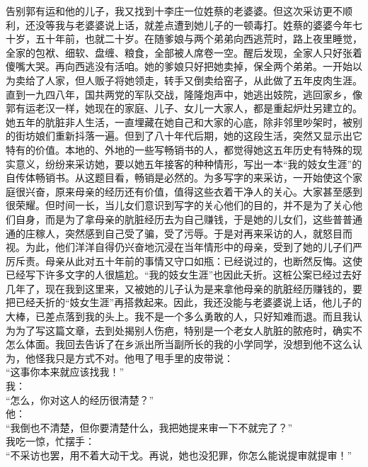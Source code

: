 告别郭有运和他的儿子，我又找到十李庄一位姓蔡的老婆婆。但这次采访更不顺利，还没等我与老婆婆说上话，就差点遭到她儿子的一顿毒打。姓蔡的婆婆今年七十岁，五十年前，也就二十岁。在随爹娘与两个弟弟向西逃荒时，路上夜里睡觉，全家的包袱、细软、盘缠、粮食，全部被人席卷一空。醒后发现，全家人只好张着傻嘴大哭。再向西逃没有活咱。她的爹娘只好把她卖掉，保全两个弟弟。一开始以为卖给了人家，但人贩子将她领走，转手又倒卖给窑子，从此做了五年皮肉生涯。直到一九四八年，国共两党的军队交战，隆隆炮声中，她逃出妓院，逃回家乡，像郭有运老汉一样，她现在的家庭、儿子、女儿一大家人，都是重起炉灶另建立的。她五年的肮脏非人生活，一直埋藏在她自己和大家的心底，除非邻里吵架时，被别的街坊娘们重新抖落一遍。但到了八十年代后期，她的这段生活，突然又显示出它特有的价值。本地的、外地的一些写畅销书的人，都觉得她这五年历史有特殊的现实意义，纷纷来采访她，要以她五年接客的种种情形，写出一本“我的妓女生涯”的自传体畅销书。从这题目看，畅销是必然的。为多写字的来采访，一开始使这个家庭很兴奋，原来母亲的经历还有价值，值得这些衣着干净人的关心。大家甚至感到很荣耀。但时间一长，当儿女们意识到写字的关心他们的目的，并不是为了关心他们自身，而是为了拿母亲的肮脏经历去为自己赚钱，于是她的儿女们，这些普普通通的庄稼人，突然感到自己受了骗，受了污辱。于是对再来采访的人，就怒目而视。为此，他们洋洋自得仍兴奋地沉浸在当年情形中的母亲，受到了她的儿子们严厉斥责。母亲从此对五十年前的事情又守口如瓶：已经说过的，也断然反悔。这使已经写下许多文字的人很尴尬。“我的妓女生涯”也因此夭折。这桩公案已经过去好几年了，现在我到这里来，又被她的儿子认为是来拿他母亲的肮脏经历赚钱的，要把已经夭折的“妓女生涯”再搭救起来。因此，我还没能与老婆婆说上话，他儿子的大棒，已差点落到我的头上。我不是一个多么勇敢的人，只好知难而退。而且我认为为了写这篇文章，去到处揭别人伤疤，特别是一个老女人肮脏的脓疮时，确实不怎么体面。我回去告诉了在乡派出所当副所长的我的小学同学，没想到他不这么认为，他怪我只是方式不对。他甩了甩手里的皮带说：\\

“这事你本来就应该找我！”\\

我：\\

“怎么，你对这人的经历很清楚？”\\

他：\\

“我倒也不清楚，但你要清楚什么，我把她提来审一下不就完了？”\\

我吃一惊，忙摆手：\\

“不采访也罢，用不着大动干戈。再说，她也没犯罪，你怎么能说提审就提审！”\\

